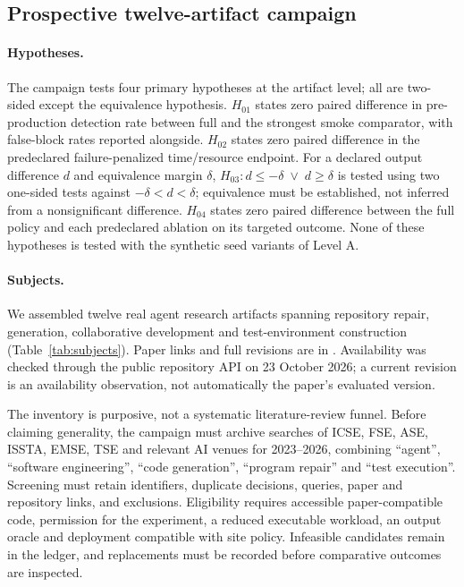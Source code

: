 \subsection{Prospective twelve-artifact campaign}\label{sec:campaign}
\paragraph{Hypotheses.} The campaign tests four primary hypotheses at the artifact level; all are two-sided except the equivalence hypothesis. $H_{01}$ states zero paired difference in pre-production detection rate between full \tool{} and the strongest smoke comparator, with false-block rates reported alongside. $H_{02}$ states zero paired difference in the predeclared failure-penalized time/resource endpoint. For a declared output difference $d$ and equivalence margin $\delta$, $H_{03}:d\leq-\delta\;\lor\;d\geq\delta$ is tested using two one-sided tests against $-\delta<d<\delta$; equivalence must be established, not inferred from a nonsignificant difference. $H_{04}$ states zero paired difference between the full policy and each predeclared ablation on its targeted outcome. None of these hypotheses is tested with the synthetic seed variants of Level A.

\paragraph{Subjects.} We assembled twelve real agent research artifacts spanning repository repair, generation, collaborative development and test-environment construction (Table~\ref{tab:subjects}). Paper links and full revisions are in . Availability was checked through the public repository API on 23 October 2026; a current revision is an availability observation, not automatically the paper's evaluated version.
\begin{table}[t]
\caption{Candidate artifacts of the prospective campaign. Every comparative execution status is currently \emph{not run}. HEADs are availability observations, not validated paper-version pins.}\label{tab:subjects}
\small
\end{table}

The inventory is purposive, not a systematic literature-review funnel. Before claiming generality, the campaign must archive searches of ICSE, FSE, ASE, ISSTA, EMSE, TSE and relevant AI venues for 2023--2026, combining ``agent'', ``software engineering'', ``code generation'', ``program repair'' and ``test execution''. Screening must retain identifiers, duplicate decisions, queries, paper and repository links, and exclusions. Eligibility requires accessible paper-compatible code, permission for the experiment, a reduced executable workload, an output oracle and deployment compatible with site policy. Infeasible candidates remain in the ledger, and replacements must be recorded before comparative outcomes are inspected.


